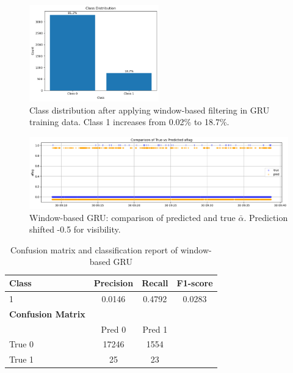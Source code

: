 \begin{figure}[H]
    \centering
    \includegraphics[width=0.5\textwidth]{figures/win_gru_distribution.png}
    \caption{Class distribution after applying window-based filtering in GRU training data. Class 1 increases from 0.02\% to 18.7\%.}
    \label{fig:win-gru-distribution}
\end{figure}

\begin{figure}[H]
    \centering
    \includegraphics[width=\textwidth]{figures/win_gru_pred_vs_true.png}
    \caption{Window-based GRU: comparison of predicted and true $\bar{\alpha}$. Prediction shifted -0.5 for visibility.}
    \label{fig:win-gru-pred-vs-true}
\end{figure}

\begin{table}[H]
    \centering
    \caption{Confusion matrix and classification report of window-based GRU}
    \label{tab:win-gru-metrics}
    \begin{tabular}{lccc}
        \toprule
        Class & Precision & Recall & F1-score\\
        \midrule
        1 & 0.0146 & 0.4792 & 0.0283 \\
        \midrule
        \textbf{Confusion Matrix} & \multicolumn{3}{c}{} \\
        \midrule
        & Pred 0 & Pred 1 &  \\
        \midrule
        True 0 & 17246 & 1554 &  \\
        True 1 & 25 & 23 &  \\
        \bottomrule
    \end{tabular}
\end{table}

